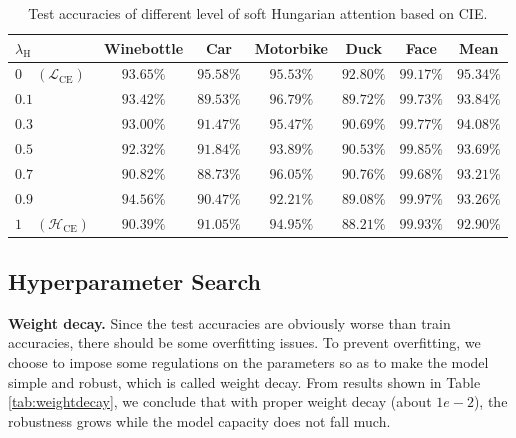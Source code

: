 \documentclass[a4paper]{article}
\begin{document}
\begin{table}[htbp]
    \centering
    \begin{tabular}{lcccccc}
        \toprule
        $\lambda_{\mathrm{H}}$& Winebottle& Car& Motorbike& Duck& Face& Mean\\
        \midrule
        $0\quad (\mathcal{L}_{\mathrm{CE}})$&$93.65\%$& $\mathbf{95.58\%}$& $95.53\%$& $\mathbf{92.80\%}$& $99.17\%$& $\mathbf{95.34\%}$\\
        $0.1$& $93.42\%$& $89.53\%$& $96.79\%$& $89.72\%$& $99.73\%$& $93.84\%$\\
        $0.3$& $93.00\%$& $91.47\%$& $95.47\%$& $90.69\%$& $99.77\%$& $94.08\%$\\
        $0.5$& $92.32\%$& $91.84\%$& $93.89\%$& $90.53\%$& $99.85\%$& $93.69\%$\\
        $0.7$& $90.82\%$& $88.73\%$& $\mathbf{96.05\%}$& $90.76\%$& $99.68\%$& $93.21\%$\\
        $0.9$& $\mathbf{94.56\%}$& $90.47\%$& $92.21\%$& $89.08\%$& $\mathbf{99.97\%}$& $93.26\%$\\
        $1\quad (\mathcal{H}_{\mathrm{CE}})$& $90.39\%$& $91.05\%$& $94.95\%$& $88.21\%$& $99.93\%$& $92.90\%$\\
        \bottomrule
        
    \end{tabular}
    \caption{Test accuracies of different level of soft Hungarian attention based on CIE.}
    \label{tab:hungarian}
\end{table}

\subsection{Hyperparameter Search}
\textbf{Weight decay.}
Since the test accuracies are obviously worse than train accuracies, there should be some overfitting issues. To prevent overfitting, we choose to impose some regulations on the parameters so as to make the model simple and robust, which is called weight decay. From results shown in Table \ref{tab:weightdecay}, we conclude that with proper weight decay (about $1e-2$), the robustness grows while the model capacity does not fall much.
\end{document}
